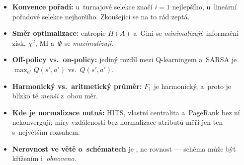 \documentclass[11pt,a4paper]{article}
\begin{document}
\bigskip
\begin{center}
\begin{minipage}{0.9\textwidth}
\begin{poznbox}
\small
\begin{itemize}
\item \textbf{Konvence pořadí:} u~turnajové selekce značí $i=1$ nejlepšího, u~lineární
  pořadové selekce nejhoršího. Zkoušející se na to rád zeptá.
\item \textbf{Směr optimalizace:} entropie $H(A)$ a~Gini se \emph{minimalizují}, informační
  zisk, $\chi^2$, MI a~$\Phi$ se \emph{maximalizují}.
\item \textbf{Off-policy vs.\ on-policy:} jediný rozdíl mezi Q-learningem a~SARSA je
  $\max_{a'}Q(s',a')$ vs.\ $Q(s',a')$.
\item \textbf{Harmonický vs.\ aritmetický průměr:} $F_1$ je harmonický, a~proto je blízko
  té \emph{menší} z~obou měr.
\item \textbf{Kde je normalizace nutná:} HITS, vlastní centralita a~PageRank bez ní
  nekonvergují; míry vzdálenosti bez normalizace atributů měří jen ten s~největším
  rozsahem.
\item \textbf{Nerovnost ve větě o~schématech} je \uv{$\ge$}, ne rovnost --- schéma může
  být křížením i~\emph{obnoveno}.
\end{itemize}
\end{poznbox}
\end{minipage}
\end{center}
\end{document}

